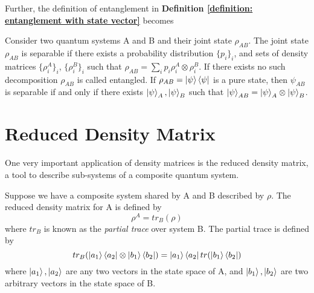 Further, the definition of entanglement in \textbf{Definition \ref{definition: entanglement with state vector}} becomes 
\begin{definition}[Entanglement] \label{def: entanglement with density matrix}
 Consider two quantum systems A and B and their joint state $\rho_{AB}$. The joint state $\rho_{AB}$ is separable if there exists a probability distribution $\{p_i\}_i$, and sets of density matrices $\{\rho_i^A\}_i$, $\{\rho_i^B\}_i$ such that $\rho_{AB}=\sum_i p_i\rho_i^A\otimes\rho_i^B$.
 If there exists no such decomposition $\rho_{AB}$ is called entangled.
 If $\rho_{AB}=\ket{\psi}\bra{\psi}$ is a pure state, then $\psi_{AB}$ is separable if and only if there exists $\ket{\psi}_A, \ket{\psi}_B$ such that $\ket{\psi}_{AB}=\ket{\psi}_A \otimes \ket{\psi}_B$.
\end{definition}

\section{Reduced Density Matrix}
One very important application of density matrices is the reduced density matrix, a tool to describe sub-systems of a composite quantum system.
\begin{definition}
 Suppose we have a composite system shared by A and B described by $\rho$. The reduced density matrix for A is defined by
\begin{equation}
    \rho^A=tr_B (\rho)
\end{equation}
where $tr_B$ is known as the \textit{partial trace} over system B. The partial trace is defined by
\begin{equation}
tr_B(\ket{a_1}\bra{a_2} \otimes \ket{b_1} \bra{b_2})=\ket{a_1}\bra{a_2}tr(\ket{b_1}\bra{b_2})
\end{equation}
where $\ket{a_1}, \ket{a_2}$ are any two vectors in the state space of A, and $\ket{b_1}, \ket{b_2}$ are two arbitrary vectors in the state space of B.
\end{definition}

